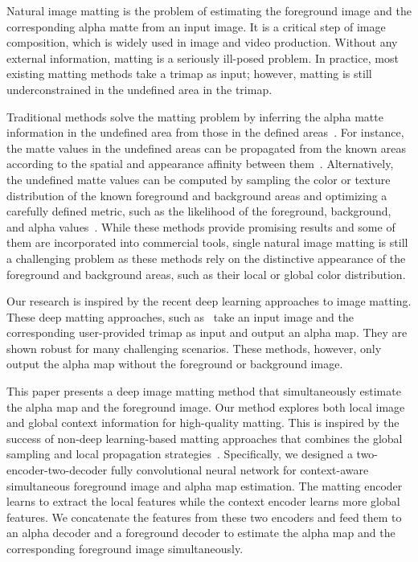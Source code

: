 \documentclass[10pt,twocolumn,letterpaper]{article}
\begin{document}
Natural image matting is the problem of estimating the foreground image and the corresponding alpha matte from an input image. It is a critical step of image composition, which is widely used in image and video production. Without any external information, matting is a seriously ill-posed problem. In practice, most existing matting methods take a trimap as input; however, matting is still underconstrained in the undefined area in the trimap.   

Traditional methods solve the matting problem by inferring the alpha matte information in the undefined area from those in the defined areas~\cite{wang2008image}. For instance, the matte values in the undefined areas can be propagated from the known areas according to the spatial and appearance affinity between them~\cite{aksoy2017designing, chen2013knn, chen2013image, he2010fast, lee2011nonlocal, levin2008closed, levin2008spectral,  sun2004poisson}. Alternatively, the undefined matte values can be computed by sampling the color or texture distribution of the known foreground and background areas and optimizing a carefully defined metric, such as the likelihood of the foreground, background, and alpha values~\cite{chuang2001bayesian, he2013iterative, he2011global, wang2005iterative, wang2007optimized}. While these methods provide promising results and some of them are incorporated into commercial tools, single natural image matting is still a challenging problem as these methods rely on the distinctive appearance of the foreground and background areas, such as their local or global color distribution. 

Our research is inspired by the recent deep learning approaches to image matting. These deep matting approaches, such as~\cite{chen2018tom, lutz2018alphagan, xu2017deep} take an input image and the corresponding user-provided trimap as input and output an alpha map. They are shown robust for many challenging scenarios. These methods, however, only output the alpha map without the foreground or background image. 

This paper presents a deep image matting method that simultaneously estimate the alpha map and the foreground image. Our method explores both local image and global context information for high-quality matting. This is inspired by the success of non-deep learning-based matting approaches that combines the global sampling and local propagation strategies~\cite{aksoy2017designing, chen2013knn, chen2013image, he2010fast, he2011global}. Specifically, we designed a two-encoder-two-decoder fully convolutional neural network for context-aware simultaneous foreground image and alpha map estimation. The matting encoder learns to extract the local features while the context encoder learns more global features. We concatenate the features from these two encoders and feed them to an alpha decoder and a foreground decoder to estimate the alpha map and the corresponding foreground image simultaneously. 
\end{document}
